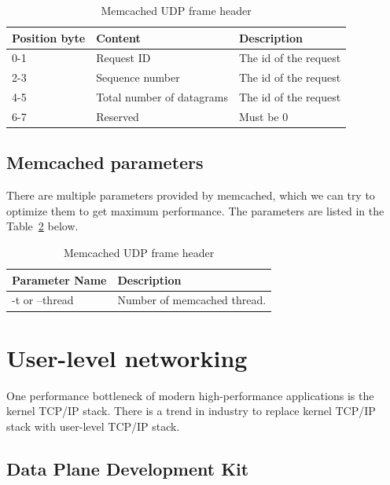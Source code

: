 \documentclass[bsc,frontabs,twoside,singlespacing,parskip,deptreport]{infthesis}     %
\begin{document}
\begin{table}[h]
\centering
\begin{tabular}{ |p{4cm}||p{4cm}||p{4cm}|  }

 \hline
 Position byte & Content & Description \\
 \hline
0-1  & Request ID  & The id of the request\\
 \hline
 2-3  & Sequence number  & The id of the request\\
 \hline
 4-5  & Total number of datagrams  & The id of the request\\
 \hline
 6-7  & Reserved  & Must be 0\\
 \hline

 
\end{tabular}
\caption{Memcached UDP frame header}
\label{tab:mem_proto_udp}


\end{table}




\subsection{Memcached parameters}
\label{parameter}
There are multiple parameters provided by memcached, which we can try to optimize them to get maximum performance. The parameters are listed in the Table~\ref{tab:mem_parameter} below.

\begin{table}[h]
	\centering
	\begin{tabular}{ |p{4cm}||p{8cm} |}
	
	 \hline
	 Parameter Name & Description  \\
	 \hline
	 -t or --thread  & Number of memcached thread.  \\
	 \hline
	 
	\end{tabular}
	\caption{Memcached UDP frame header}
	\label{tab:mem_parameter}
	
\end{table}


\section{User-level networking}
One performance bottleneck of modern high-performance applications is the kernel TCP/IP stack. There is a trend in industry to replace kernel TCP/IP stack with user-level TCP/IP stack.



\subsection{Data Plane Development Kit}
\end{document}
